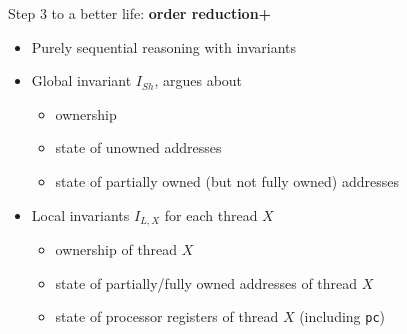 \documentclass{beamer}
\begin{document}
\begin{frame}
Step 3 to a better life: \textbf{order reduction+}

\begin{itemize}
	\item Purely sequential reasoning with invariants
	\item Global invariant $I_{Sh}$, argues about
	\begin{itemize} 
		\item ownership
		\item state of unowned addresses
		\item state of partially owned (but not fully owned) addresses
	\end{itemize}
	\item Local invariants $I_{L,X}$ for each thread $X$
	\begin{itemize} 
		\item ownership of thread $X$
		\item state of partially/fully owned addresses of thread $X$
		\item state of processor registers of thread $X$ (including \texttt{pc})
	\end{itemize}
\end{itemize}
\end{frame}




\end{document}
